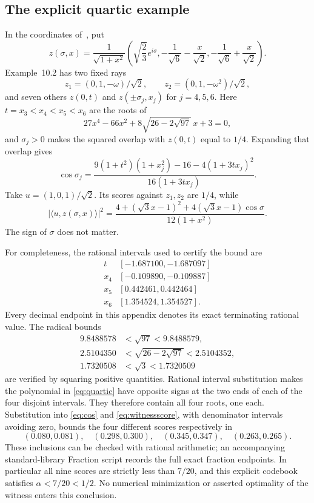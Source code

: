 \documentclass[11pt,a4paper]{article}
\theoremstyle{remark}
\numberwithin{equation}{section}
\newcommand{\ip}[2]{\langle #1,#2\rangle}
\begin{document}
\subsection{The explicit quartic example}
In the coordinates of~\cite[(6.3)]{HS}, put
\[
 z(\sigma,x)=\frac1{\sqrt{1+x^2}}
 \left(\sqrt{\frac23}e^{i\sigma},
       -\frac1{\sqrt6}-\frac{x}{\sqrt2},
       -\frac1{\sqrt6}+\frac{x}{\sqrt2}\right).
\]
Example~10.2 has two fixed rays
\[
 z_1=(0,1,-\omega)/\sqrt2,\qquad z_2=(0,1,-\omega^2)/\sqrt2,
\]
and seven others $z(0,t)$ and $z(\pm\sigma_j,x_j)$ for $j=4,5,6$. Here $t=x_3<x_4<x_5<x_6$ are the roots of
\begin{equation}\label{eq:quartic}
 27x^4-66x^2+8\sqrt{26-2\sqrt{97}}\,x+3=0,
\end{equation}
and $\sigma_j>0$ makes the squared overlap with $z(0,t)$ equal to $1/4$. Expanding that overlap gives
\begin{equation}\label{eq:cos}
 \cos\sigma_j=
 \frac{9(1+t^2)(1+x_j^2)-16-4(1+3tx_j)^2}{16(1+3tx_j)}.
\end{equation}
Take $u=(1,0,1)/\sqrt2$. Its scores against $z_1,z_2$ are $1/4$, while
\begin{equation}\label{eq:witnessscore}
 |\ip u{z(\sigma,x)}|^2=
 \frac{4+(\sqrt3x-1)^2+4(\sqrt3x-1)\cos\sigma}{12(1+x^2)}.
\end{equation}
The sign of $\sigma$ does not matter.

For completeness, the rational intervals used to certify the bound are
\[
\begin{array}{c|c}
 t&[-1.687100,-1.687097]\\
 x_4&[-0.109890,-0.109887]\\
 x_5&[0.442461,0.442464]\\
 x_6&[1.354524,1.354527].
\end{array}
\]
Every decimal endpoint in this appendix denotes its exact terminating rational value. The radical bounds
\begin{align*}
 9.8488578&<\sqrt{97}<9.8488579,\\
 2.5104350&<\sqrt{26-2\sqrt{97}}<2.5104352,\\
 1.7320508&<\sqrt3<1.7320509
\end{align*}
are verified by squaring positive quantities. Rational interval substitution makes the polynomial in \eqref{eq:quartic} have opposite signs at the two ends of each of the four disjoint intervals. They therefore contain all four roots, one each. Substitution into \eqref{eq:cos} and \eqref{eq:witnessscore}, with denominator intervals avoiding zero, bounds the four different scores respectively in
\[
 (0.080,0.081),\quad(0.298,0.300),\quad
 (0.345,0.347),\quad(0.263,0.265).
\]
These inclusions can be checked with rational arithmetic; an accompanying standard-library Fraction script records the full exact fraction endpoints. In particular all nine scores are strictly less than $7/20$, and this explicit codebook satisfies $\alpha<7/20<1/2$. No numerical minimization or asserted optimality of the witness enters this conclusion.
\end{document}
